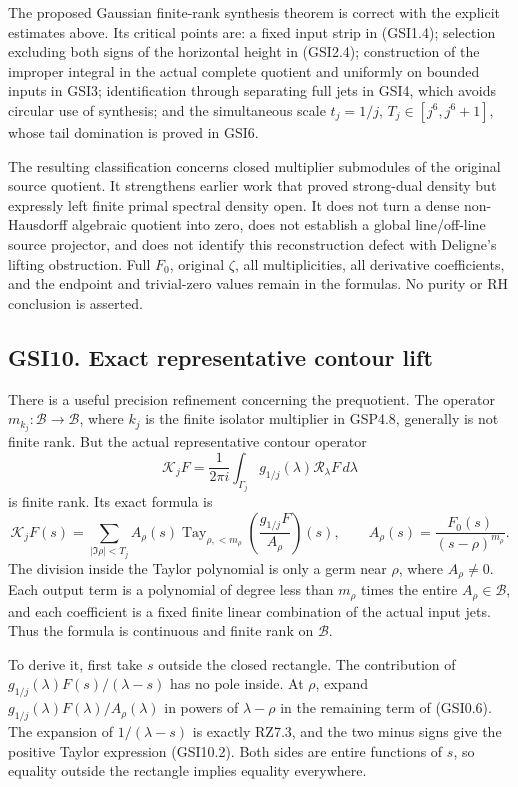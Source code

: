 The proposed Gaussian finite-rank synthesis theorem is correct with the
explicit estimates above. Its critical points are: a fixed input strip
in (GSI1.4); selection excluding both signs of the horizontal height in
(GSI2.4); construction of the improper integral in the actual complete
quotient and uniformly on bounded inputs in GSI3; identification through
separating full jets in GSI4, which avoids circular use of synthesis;
and the simultaneous scale \(t_j=1/j\), \(T_j\in[j^6,j^6+1]\), whose
tail domination is proved in GSI6.

The resulting classification concerns closed multiplier submodules of
the original source quotient. It strengthens earlier work that proved
strong-dual density but expressly left finite primal spectral density
open. It does not turn a dense non-Hausdorff algebraic quotient into
zero, does not establish a global line/off-line source projector, and
does not identify this reconstruction defect with Deligne's lifting
obstruction. Full \(F_0\), original \(\zeta\), all multiplicities, all
derivative coefficients, and the endpoint and trivial-zero values remain
in the formulas. No purity or RH conclusion is asserted.

\subsection{GSI10. Exact representative contour
lift}\label{gsi10.-exact-representative-contour-lift}

There is a useful precision refinement concerning the prequotient. The
operator \(m_{k_j}:\mathcal B\to\mathcal B\), where \(k_j\) is the
finite isolator multiplier in GSP4.8, generally is not finite rank. But
the actual representative contour operator \[
\mathscr K_jF=\frac1{2\pi i}\int_{\Gamma_j}
g_{1/j}(\lambda)\mathscr R_\lambda F\,d\lambda
\tag{GSI10.1}
\] is finite rank. Its exact formula is \[
\mathscr K_jF(s)=\sum_{|\Im\rho|<T_j}
A_\rho(s)\operatorname{Tay}_{\rho,<m_\rho}
\left(\frac{g_{1/j}F}{A_\rho}\right)(s),
\qquad A_\rho(s)=\frac{F_0(s)}{(s-\rho)^{m_\rho}}.
\tag{GSI10.2}
\] The division inside the Taylor polynomial is only a germ near
\(\rho\), where \(A_\rho\ne0\). Each output term is a polynomial of
degree less than \(m_\rho\) times the entire \(A_\rho\in\mathcal B\),
and each coefficient is a fixed finite linear combination of the actual
input jets. Thus the formula is continuous and finite rank on
\(\mathcal B\).

To derive it, first take \(s\) outside the closed rectangle. The
contribution of \(g_{1/j}(\lambda)F(s)/(\lambda-s)\) has no pole inside.
At \(\rho\), expand \(g_{1/j}(\lambda)F(\lambda)/A_\rho(\lambda)\) in
powers of \(\lambda-\rho\) in the remaining term of (GSI0.6). The
expansion of \(1/(\lambda-s)\) is exactly RZ7.3, and the two minus signs
give the positive Taylor expression (GSI10.2). Both sides are entire
functions of \(s\), so equality outside the rectangle implies equality
everywhere.

